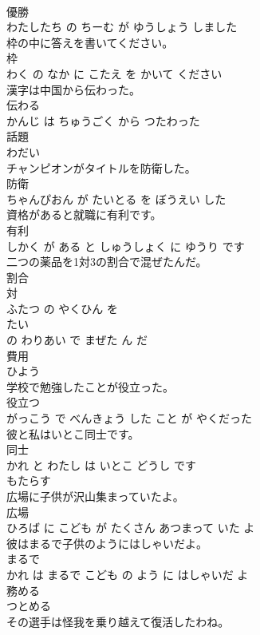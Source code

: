 \documentclass[8pt]{extreport}
\begin{document}
\begin{CJK}{UTF8}{min}
\\	優勝 
\\	わたしたち の ちーむ が ゆうしょう しました			
\\	枠の中に答えを書いてください。	
\\	枠 
\\	わく の なか に こたえ を かいて ください			
\\	漢字は中国から伝わった。	
\\	伝わる 
\\	かんじ は ちゅうごく から つたわった			
\\	話題	
\\	わだい			
\\	チャンピオンがタイトルを防衛した。	
\\	防衛 
\\	ちゃんぴおん が たいとる を ぼうえい した			
\\	資格があると就職に有利です。	
\\	有利 
\\	しかく が ある と しゅうしょく に ゆうり です			
\\	二つの薬品を1対3の割合で混ぜたんだ。	
\\	割合 
\\	対 
\\	ふたつ の やくひん を 
\\	たい 
\\	の わりあい で まぜた ん だ			
\\	費用	
\\	ひよう			
\\	学校で勉強したことが役立った。	
\\	役立つ 
\\	がっこう で べんきょう した こと が やくだった			
\\	彼と私はいとこ同士です。	
\\	同士 
\\	かれ と わたし は いとこ どうし です			
\\	もたらす	
\\	広場に子供が沢山集まっていたよ。	
\\	広場 
\\	ひろば に こども が たくさん あつまって いた よ			
\\	彼はまるで子供のようにはしゃいだよ。	
\\	まるで 
\\	かれ は まるで こども の よう に はしゃいだ よ			
\\	務める	
\\	つとめる			
\\	その選手は怪我を乗り越えて復活したわね。	

\end{CJK}
\end{document}
